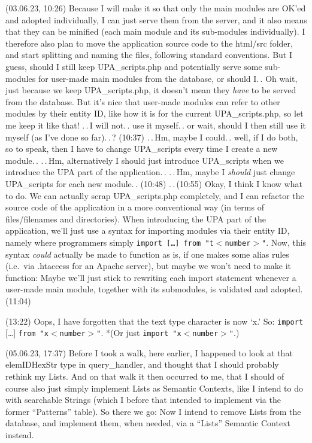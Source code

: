 \documentclass{report}
\begin{document}
(03.06.23, 10:26) Because I will make it so that only the main modules are OK'ed and adopted individually, I can just serve them from the server, and it also means that they can be minified (each main module and its sub-modules individually). I therefore also plan to move the application source code to the html/src folder, and start splitting and naming the files, following standard conventions. But I guess, should I still keep UPA\_scripts.php and potentially serve some sub-modules for user-made main modules from the database, or should I.\,. Oh wait, just because we keep UPA\_scripts.php, it doesn't mean they \emph{have} to be served from the database. But it's nice that user-made modules can refer to other modules by their entity ID, like how it is for the current UPA\_scripts.php, so let me keep it like that! .\,.\,I will not.\,. use it myself.\,. or wait, should I then still use it myself (as I've done so far).\,.\,? (10:37) .\,.\,Hm, maybe I could.\,. well, if I do both, so to speak, then I have to change UPA\_scripts every time I create a new module.\,. .\,.\,Hm, alternatively I should just introduce UPA\_scripts when we introduce the UPA part of the application.\,. .\,.\,Hm, maybe I \emph{should} just change UPA\_scripts for each new module.\,. (10:48) .\,.\,(10:55) Okay, I think I know what to do. We can actually scrap UPA\_scripts.php completely, and I can refactor the source code of the application in a more conventional way (in terms of files/filenames and directories). When introducing the UPA part of the application, we'll just use a syntax for importing modules via their entity ID, namely where programmers simply \texttt{import [\ldots] from "t$<$number$>$"}. Now, this syntax \emph{could} actually be made to function as is, if one makes some alias rules (i.e.\ via .htaccess for an Apache server), but maybe we won't need to make it function: Maybe we'll just stick to rewriting each import statement whenever a user-made main module, together with its submodules, is validated and adopted. (11:04)

(13:22) Oops, I have forgotten that the text type character is now `x.' So: \texttt{import} [\ldots] \texttt{from "x$<$number$>$"}. *(Or just \texttt{import "x$<$number$>$"}.)

(05.06.23, 17:37) Before I took a walk, here earlier, I happened to look at that elemIDHexStr type in query\_handler, and thought that I should probably rethink my Lists. And on that walk it then occurred to me, that I should of course also just simply implement Lists as Semantic Contexts, like I intend to do with searchable Strings (which I before that intended to implement via the former ``Patterns'' table). So there we go: Now I intend to remove Lists from the database, and implement them, when needed, via a ``Lists'' Semantic Context instead.
\end{document}
